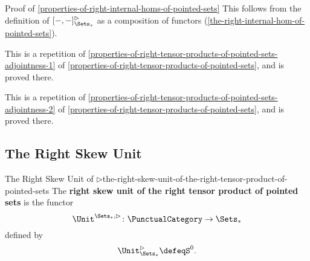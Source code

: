 \begin{Proof}{Proof of \cref{properties-of-right-internal-homs-of-pointed-sets}}%
    This follows from the definition of $[-,-]^{\rhd}_{\Sets_{*}}$ as a composition of functors (\cref{the-right-internal-hom-of-pointed-sets}).

    This is a repetition of \cref{properties-of-right-tensor-products-of-pointed-sets-adjointness-1} of \cref{properties-of-right-tensor-products-of-pointed-sets}, and is proved there.

    This is a repetition of \cref{properties-of-right-tensor-products-of-pointed-sets-adjointness-2} of \cref{properties-of-right-tensor-products-of-pointed-sets}, and is proved there.
\end{Proof}
\subsection{The Right Skew Unit}\label{subsection-the-right-skew-unit-of-the-right-tensor-product-of-pointed-sets}
\begin{definition}{The Right Skew Unit of $\rhd$}{the-right-skew-unit-of-the-right-tensor-product-of-pointed-sets}%
    The \textbf{right skew unit of the right tensor product of pointed sets} is the functor
    \[
        \Unit^{\Sets_{*},\rhd}
        \colon
        \PunctualCategory
        \to
        \Sets_{*}
    \]
    defined by
    \[
        \Unit^{\rhd}_{\Sets_{*}}%
        \defeq%
        S^{0}.
    \]%
\end{definition}

